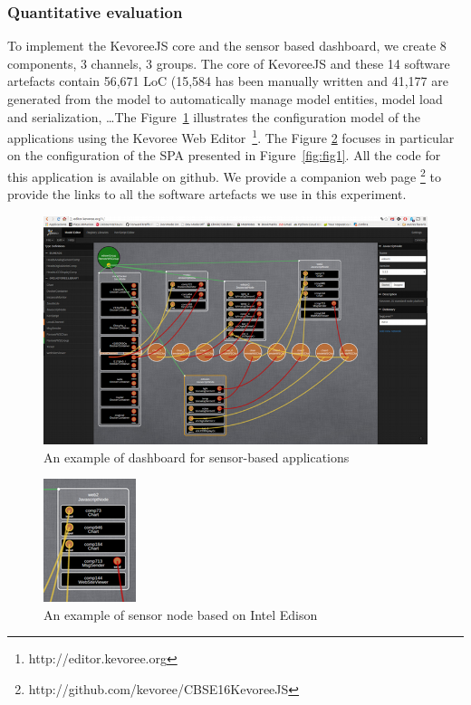 \subsubsection{Quantitative evaluation}
To implement the KevoreeJS core and the sensor based dashboard, we create 8 components, 3 channels, 3 groups. The core of KevoreeJS and these 14 software artefacts contain 56,671 LoC (15,584 has been manually written and 41,177 are generated from the model to automatically manage model entities, model load and serialization, \dots The Figure~\ref{fig:fig3}  illustrates the configuration model of the applications using the Kevoree Web Editor~\footnote{http://editor.kevoree.org}. The Figure \ref{fig:fig4} focuses in particular on the configuration of the SPA presented in Figure~\ref{fig:fig1}. All the code for this application is available on github. We provide a companion web page \footnote{http://github.com/kevoree/CBSE16KevoreeJS} to provide the links to all the software artefacts we use in this experiment.


\begin{figure}[h]
	\centering
	\includegraphics[width=1\linewidth]{figures/fig1}
	\caption{An example of dashboard for sensor-based applications}
	\label{fig:fig3}
\end{figure}


\begin{figure}[h]
	\centering
	\includegraphics[width=0.5\linewidth]{figures/fig2}
	\caption{An example of sensor node based on Intel Edison}
	\label{fig:fig4}
\end{figure}


